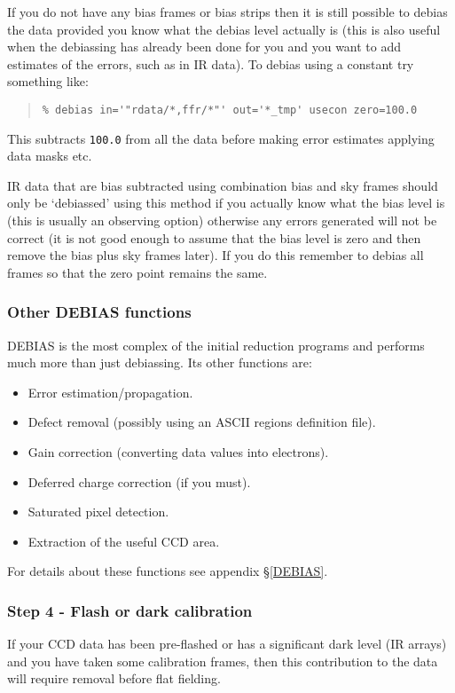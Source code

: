 \documentclass[twoside,11pt]{article}
\newcommand{\hyperref}[4]{#2\ref{#4}#3}
\newcommand{\htmlref}[2]{#1}
\newcommand{\xlabel}[1]{}
\renewcommand{\_}{\texttt{\symbol{95}}}
\newenvironment{myquote}{\begin{quote}\begin{small}}{\end{small}\end{quote}}
\newcommand{\text}[1]{{\small \tt #1}}
\newcommand{\xroutine}[1]{\htmlref{{\sc #1}}{#1}}
\begin{document}
If you do not have any bias frames or bias strips then it is still
possible to debias the data provided you know what the debias level
actually is (this is also useful when the debiassing has already been
done for you and you want to add estimates of the errors, such as in
IR data).
To debias using a constant try something like:
\begin{myquote}
\begin{verbatim}
% debias in='"rdata/*,ffr/*"' out='*_tmp' usecon zero=100.0
\end{verbatim}
\end{myquote}
This subtracts \text{100.0} from all the data before making error
estimates applying data masks etc.

IR data that are bias subtracted using combination bias and sky frames
should only be `debiassed' using this method if you actually know what
the bias level is (this is usually an observing option) otherwise any
errors generated will not be correct (it is not good enough to assume
that the bias level is zero and then remove the bias plus sky frames
later).
If you do this remember to debias all frames so that the zero point
remains the same.

\subsubsection{Other DEBIAS functions}
\xroutine{DEBIAS} is the most complex of the initial reduction programs and
performs much more than just debiassing. Its other functions are:
\begin{itemize}
\item Error estimation/propagation.
\item Defect removal (possibly using an \htmlref{ASCII regions definition
file}{datamasks}).
\item Gain correction (converting data values into electrons).
\item Deferred charge correction (if you must).
\item Saturated pixel detection.
\item Extraction of the useful CCD area.
\end{itemize}

For details about these functions see
\hyperref{the full description}{appendix \S}{}{DEBIAS}.

\subsubsection{\xlabel{flashordark}Step 4 - Flash or dark calibration
               \label{flashordark}}
If your CCD data has been pre-flashed or has a significant dark level
(IR arrays) and you have taken some calibration frames, then this
contribution to the data will require removal before flat fielding.
\end{document}
